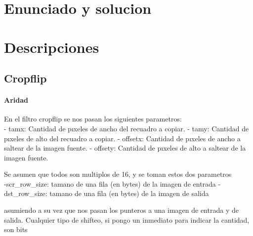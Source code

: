 \documentclass[a4paper]{article}
\newenvironment{codesnippet}{%
	\begin{Sbox}\begin{minipage}{\textwidth}\sffamily\small}%
	{\end{minipage}\end{Sbox}%
		\begin{center}%
		\vspace{-0.4cm}\colorbox{litegrey}{\TheSbox}\end{center}\vspace{0.3cm}}
\begin{document}


\section{Enunciado y solucion} 
%


\section{Descripciones}

\subsection{Cropflip}

\paragraph{\textbf{Aridad}}

En el filtro cropflip se nos pasan los siguientes parametros:
\hfill \break
\\
- tamx: Cantidad de pıxeles de ancho del recuadro a copiar.
\hfill \break
- tamy: Cantidad de pıxeles de alto del recuadro a copiar.
\hfill \break
- offsetx: Cantidad de pıxeles de ancho a saltear de la imagen fuente.
\hfill \break
- offsety: Cantidad de pıxeles de alto a saltear de la imagen fuente.
\hfill \break

Se asumen que todos son multiplos de 16, y se toman estos dos parametros
\hfill \break
\\
-scr_row_size: tamano de una fila (en bytes) de la imagen de entrada
\hfill \break
-dst_row_size: tamano de una fila (en bytes) de la imagen de salida
\hfill \break

asumiendo a su vez que nos pasan los punteros a una imagen de entrada y de salida. Cualquier tipo de shifteo, si pongo un inmediato para indicar la cantidad, son bits
\hfill \break
\end{document}
